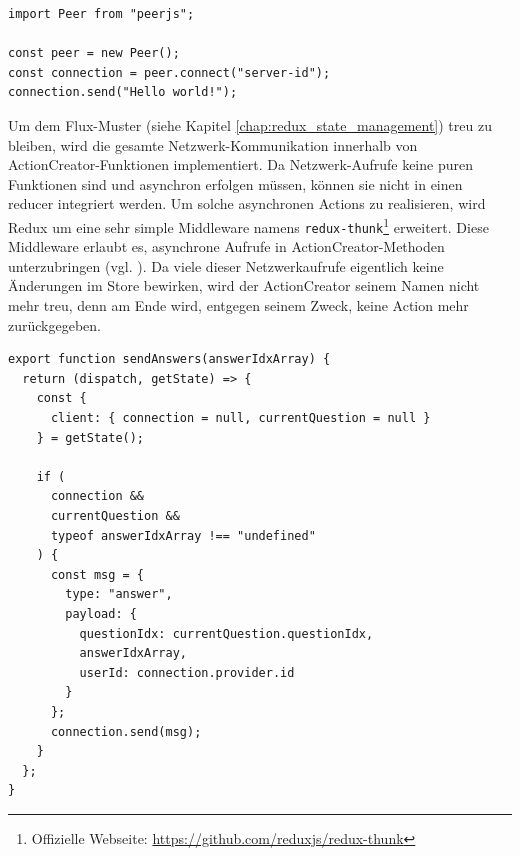 \begin{minipage}{\linewidth}
\begin{lstlisting}[caption={Verbindungsaufbau mit der PeerJS-Bibliothek auf der Client-Seite. (aus: src/client/actions/client.js)}]
import Peer from "peerjs";

const peer = new Peer();
const connection = peer.connect("server-id");
connection.send("Hello world!");
\end{lstlisting}
\end{minipage}

Um dem Flux-Muster (siehe Kapitel \ref{chap:redux_state_management}) treu zu bleiben, wird die gesamte Netzwerk-Kommunikation innerhalb von ActionCreator-Funktionen implementiert. Da Netzwerk-Aufrufe keine puren Funktionen sind und asynchron erfolgen müssen, können sie nicht in einen reducer integriert werden. Um solche asynchronen Actions zu realisieren, wird Redux um eine sehr simple Middleware namens \texttt{redux-thunk}\footnote{Offizielle Webseite: \url{https://github.com/reduxjs/redux-thunk}} erweitert. Diese Middleware erlaubt es, asynchrone Aufrufe in ActionCreator-Methoden unterzubringen (vgl. \cite{web:redux_async_actions}). Da viele dieser Netzwerkaufrufe eigentlich keine Änderungen im Store bewirken, wird der ActionCreator seinem Namen nicht mehr treu, denn am Ende wird, entgegen seinem Zweck, keine Action mehr zurückgegeben.

\begin{minipage}{\linewidth}
\begin{lstlisting}[caption={ActionCreator zum Versenden von Antworten vom Client zum Server. (aus: src/client/actions/client.js)}]
export function sendAnswers(answerIdxArray) {
  return (dispatch, getState) => {
    const {
      client: { connection = null, currentQuestion = null }
    } = getState();

    if (
      connection &&
      currentQuestion &&
      typeof answerIdxArray !== "undefined"
    ) {
      const msg = {
        type: "answer",
        payload: {
          questionIdx: currentQuestion.questionIdx,
          answerIdxArray,
          userId: connection.provider.id
        }
      };
      connection.send(msg);
    }
  };
}
\end{lstlisting}
\end{minipage}